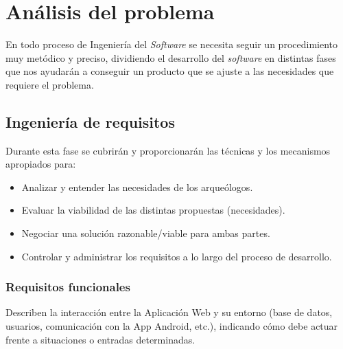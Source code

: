 \chapter{Análisis del problema}
 
En todo proceso de Ingeniería del \textit{Software} se necesita seguir un procedimiento muy
metódico y preciso, dividiendo el desarrollo del \textit{software} en distintas fases que
nos ayudarán a conseguir un producto que se ajuste a las necesidades que requiere el
problema.

\section{Ingeniería de requisitos}
Durante esta fase se cubrirán y proporcionarán las técnicas y los mecanismos apropiados
para:

    \begin{itemize}
        \item Analizar y entender las necesidades de los arqueólogos.
        \item Evaluar la viabilidad de las distintas propuestas (necesidades).
        \item Negociar una solución razonable/viable para ambas partes.
        \item Controlar y administrar los requisitos a lo largo del proceso de desarrollo.
    \end{itemize}

\subsection{Requisitos funcionales}
Describen la interacción entre la Aplicación Web y su entorno (base de datos, usuarios, 
comunicación con la App Android, etc.), indicando cómo debe actuar frente a situaciones o
entradas determinadas.

